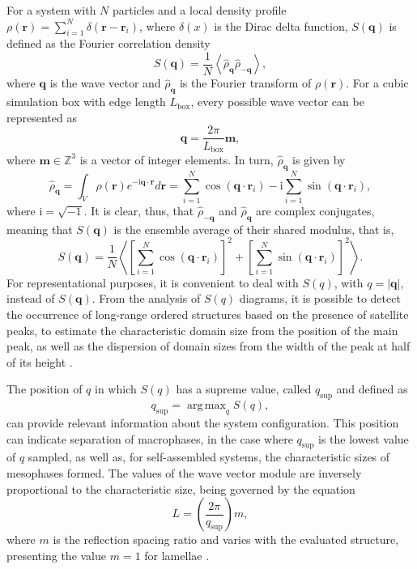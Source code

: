 \documentclass[
journal=mamobx,
manuscript=article,
]{achemso}
\DeclareMathOperator*{\argmax}{arg\,max}
\newcommand{\vt}[1]{\boldsymbol{\mathbf{#1}}}          %
\begin{document}
For a system with $N$ particles and a local density profile $\rho(\vt r) = \sum_{i=1}^N \delta(\vt r - \vt r_i)$, where $\delta(x)$ is the Dirac delta function, $S(\vt q)$ is defined as the Fourier correlation density
\begin{equation}
S(\vt q) = \frac{1}{N} \left\langle \hat{\rho}_{\vt q} \hat{\rho}_{-\vt q} \right\rangle,
\end{equation}
where $\vt q$ is the wave vector and $\hat{\rho}_{\vt q}$ is the Fourier transform of $\rho(\vt r)$.
For a cubic simulation box with edge length $L_\mathrm{box}$, every possible wave vector can be represented as
\begin{equation}
\vt q = \frac{2 \pi}{L_\mathrm{box}} {\vt m},
\end{equation}
where ${\vt m} \in \mathbb{Z}^3$ is a vector of integer elements.
In turn, $\hat{\rho}_{\vt q}$ is given by
\begin{equation}
\hat{\rho}_{\vt q} = \int_V {\rho}({\vt r}) e^{-\mathrm{i} {\vt q} \cdot \vt r} d{\vt r} = \sum_{i=1}^N \cos(\vt q \cdot \vt r_i) -\mathrm{i}  \sum_{i=1}^N \sin(\vt q \cdot \vt r_i),
\end{equation}
where $\mathrm{i} = \sqrt{-1}$.
It is clear, thus, that $\hat{\rho}_{-\vt q}$ and $\hat{\rho}_{\vt q}$ are complex conjugates, meaning that $S(\vt q)$ is the ensemble average of their shared modulus, that is, \cite{Zhang_2016}
\begin{equation}
S(\vt q) = \frac{1}{N} \left\langle \left[\sum_{i=1}^N \cos(\vt q \cdot \vt r_i)\right]^2 + \left[\sum_{i=1}^N \sin(\vt q \cdot \vt r_i)\right]^2 \right\rangle.
\end{equation}
For representational purposes, it is convenient to deal with $S(q)$, with $q = |\vt q|$, instead of $S(\vt q)$.
From the analysis of $S(q)$ diagrams, it is possible to detect the occurrence of long-range ordered structures based on the presence of satellite peaks, to estimate the characteristic domain size from the position of the main peak, as well as the dispersion of domain sizes from the width of the peak at half of its height \cite{Gavrilov_2013}.

The position of $q$ in which $S(q)$ has a supreme value, called $q_\mathrm{sup}$ and defined as
\begin{equation}
\label{eq:q_sup definition}
q_\mathrm{sup} = \argmax_q S(q),
\end{equation}
can provide relevant information about the system configuration.
This position can indicate separation of macrophases, in the case where $q_\mathrm{sup}$ is the lowest value of $q$ sampled, as well as, for self-assembled systems, the characteristic sizes of mesophases formed.
The values of the wave vector module  are inversely proportional to the characteristic size, being governed by the equation
\begin{equation}
\label{eq:characteristic size}
L = \left(\frac{2 \pi}{q_\mathrm{sup}}\right) m,
\end{equation}
where $m$ is the reflection spacing ratio and varies with the evaluated structure, presenting the value $m=1$ for lamellae \cite{Martinez-Veracoechea_2005}.
\end{document}
